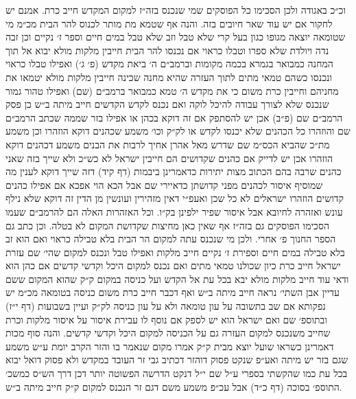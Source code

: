 \documentclass[12pt, openany]{book}
\begin{document}
\begin{multicols}{2}
וכ״כ באגודה ולכן הסכימו כל הפוסקים שמי שנכנס בזה״ז למקום המקדש חייב כרת. אמנם יש לחקור אם יש עוד שאר חיובים בזה. והנה אף שטמא מת מותר לכנוס להר הבית מכ״מ מי שטומאה יוצאה מגופו כגון בעל קרי שלא טבל וזב שלא טבל במים חיים וספר ז׳ נקיים וכן זבה נדה ויולדת שלא ספרו וטבלו כראוי אם נכנסו להר הבית חייבין מלקות מולא יבוא אל תוך המחנה כמבואר בגמרא בכמה מקומות וברמב״ם ה׳ ביאת מקדש (פ׳ ג׳) ואפילו טבלו כראוי ונכנסו כשהם טמאי מתים לתוך העזרה שהיא מחנה שכינה חייבין מלקות מולא יטמאו את מחניהם וחייבין כרת משום כי את מקדש ה׳ טמא כמבואר ברמב״ם (שם) ואפילו טהור גמור שנכנס שלא לצורך עבודה להיכל לוקה ואם נכנס לקדש הקדשים חייב מיתה ב״ש כן פסק הרמב״ם שם (פ״ב) אכן יש להסתפק אם זה דוקא בכהן או אפילו בזר שממה שכתב הרמב״ם שם והוזהרו כל הכהנים שלא יכנסו לקדש או לק״ק וכו׳ משמע שכהנים דוקא הוזהרו וכן משמע מת״כ שהביא הכס״מ שם שדרש מאל אהרן אחיך לרבות את הבנים משמע דכהנים דוקא הוזהרו אכן יש לדייק אם כהנים שקדושים הם חייבין ישראל לא כש״כ ולא שייך בזה שאני כהנים שרבה בהם הכתוב מצות יתירות כדאמרינן ביבמות (דף קיד) דזה שייך דוקא לענין מה שמוסיף איסור לכהנים מפני קדושתן כדאיירי שם אבל הכא הוי אפכא אם אפילו כהנים קדושים הוזהרו ישראלים לא כל שכן ואעפ״י דאין מזהירין ועונשין מן הדין זה דוקא שלא נילף עונש ואזהרה לחיובא אבל איסור שפיר ילפינן בק״ו. וכל האזהרות האלה הם להרמב״ם שעמו הסכימו הפוסקים גם בזה״ז אף שאין כאן מחיצות שקדושת המקום לא בטלה. וכן כתב גם הספר החנוך פ׳ אחרי. ולכן מי שנכנס עתה למקום הר הבית בלא טבילה כראוי ואם הוא זב בלא טבילה במים חיים וספירת ז׳ נקיים חייב מלקות ואפילו טבל ונכנס למקום שהי׳ שם עזרת ישראל חייב כרת כיון שכולנו טמאי מתים ואם נכנס למקום היכל וקדשי קדשים אם כהן הוא ודאי עוד חייב מלקות מולא יבא בכל עת אל הקדש ועל כניסה במקום ק״ק שהוא המקום ששם עדיין אבן השתי׳ נראה חייב מיתה ב״ש ואף דכבר חייב כרת משום כניסה בטומאה מכ״מ יש נפקותא אם שב בתשובה על עון טומאה ולא על עון כניסה לק״ק ועיין בשבועות (דף י״ז) ובתוספ׳ שם ואם ישראל הוא יש לספק אם נוסף לו עבירת איסור על איסור מלקות וכרת שחייב משנכנס למקום העזרה גם על הכניסה למקום היכל וקדשי קדשים. והנה סוף מכות דאמרינן כשראו שועל יוצא מבית ק״ק אמרו מקום שנאמר בו והזר הקרב יומת ע״ש משמע שגם בזר יש מיתה ואע״פ שנקט פסוק דוהזר דכתיב גבי זר העובד במקדש ולא פסוק דואל יבוא בכל עת כמו שהקשתי בספרי ע״ל שם י״ל דנקט הדרשה הפשוטה יותר דכן דרך הש״ס כמשכ׳ התוספ׳ בסוכה (דף כ״ד) אבל עכ״פ משמע משם דגם זר הנכנס למקום ק״ק חייב מיתה ב״ש.\\\vspace{0pt}


\end{multicols}
\end{document}
